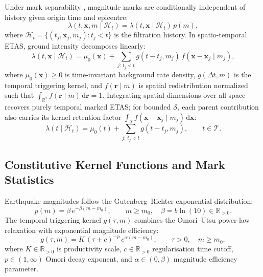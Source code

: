\begin{definition}
  \label{def:clustering_conditional_intensity}
  Under mark separability \parencite{ogata1988,ogata1998}, magnitude
  marks are conditionally independent of history given origin time
  and epicentre:
  \begin{equation}
    \lambda(t, \mathbf{x}, m \mid \mathcal{H}_t) = \lambda(t,
    \mathbf{x} \mid \mathcal{H}_t) \, p(m),
    \label{eq:clustering_intensity_separable}
  \end{equation}
  where $\mathcal{H}_t = \{(t_j, \mathbf{x}_j, m_j) : t_j < t\}$ is
  the filtration history. In spatio-temporal \ac{ETAS}, ground
  intensity decomposes linearly:
  \begin{equation}
    \lambda(t, \mathbf{x} \mid \mathcal{H}_t) = \mu_0(\mathbf{x}) +
    \sum_{j:\, t_j < t} g(t - t_j, m_j) \, f(\mathbf{x} -
    \mathbf{x}_j \mid m_j),
    \label{eq:clustering_etas_spatiotemporal}
  \end{equation}
  where $\mu_0(\mathbf{x}) \ge 0$ is time-invariant background rate
  density, $g(\Delta t, m)$ is the temporal triggering kernel, and
  $f(\mathbf{r} \mid m)$ is spatial redistribution normalized such
  that $\int_{\mathbb{R}^2} f(\mathbf{r} \mid m) \,
  \mathrm{d}\mathbf{r} = 1$. Integrating spatial dimensions over
  all space recovers purely temporal marked \ac{ETAS}; for bounded
  $\mathcal S$, each parent contribution also carries its kernel
  retention factor $\int_{\mathcal S}f(\mathbf x-\mathbf x_j\mid m_j)
  \,\mathrm{d}\mathbf x$:
  \begin{equation}
    \lambda(t \mid \mathcal{H}_t) = \mu_0(t) + \sum_{j:\, t_j < t}
    g(t - t_j, m_j), \qquad t \in \mathcal{T}.
    \label{eq:clustering_etas_temporal}
  \end{equation}
\end{definition}

\subsection{Constitutive Kernel Functions and Mark Statistics}
\label{subsec:clustering_kernels}

Earthquake magnitudes follow the Gutenberg--Richter exponential distribution:
\begin{equation}
  p(m) = \beta \, e^{-\beta(m - m_0)}, \qquad m \ge m_0, \quad \beta
  = b \ln(10) \in \mathbb{R}_{>0}.
  \label{eq:clustering_gr_pdf}
\end{equation}
The temporal triggering kernel $g(\tau, m)$ combines the Omori--Utsu
power-law relaxation with exponential magnitude efficiency:
\begin{equation}
  g(\tau, m) = K \, (\tau + c)^{-p} \, e^{\alpha(m - m_0)}, \qquad
  \tau > 0, \quad m \ge m_0,
  \label{eq:clustering_omori_kernel}
\end{equation}
where $K \in \mathbb{R}_{>0}$ is productivity scale, $c \in
\mathbb{R}_{>0}$ regularisation time cutoff, $p \in (1, \infty)$
Omori decay exponent, and $\alpha \in (0, \beta)$ magnitude
efficiency parameter.

